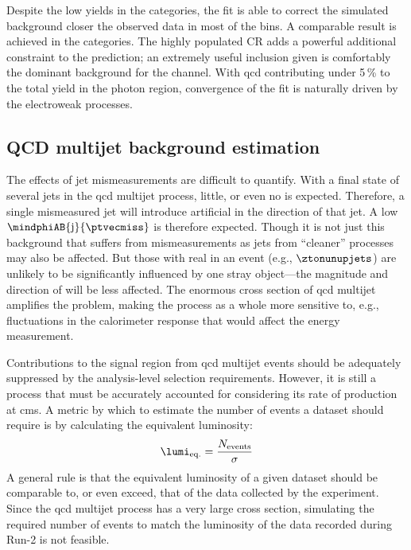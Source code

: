 Despite the low yields in the \ttH categories, the fit is able to correct the simulated background closer the observed data in most of the bins. A comparable result is achieved in the \VH categories. The highly populated \singlePhotonCr \gls{CR} adds a powerful additional constraint to the prediction; an extremely useful inclusion given \ztonunu is comfortably the dominant background for the \VH channel. With \acrshort{qcd} contributing under 5\,\% to the total yield in the photon region, convergence of the fit is naturally driven by the electroweak processes.




\subsection{QCD multijet background estimation}
\label{subsec:htoinv_qcd_multijet_bkg}

The effects of \gls{jet} mismeasurements are difficult to quantify. With a final state of several \glspl{jet} in the \acrshort{qcd} multijet process, little, or even no \ptvecmiss is expected. Therefore, a single mismeasured \gls{jet} will introduce artificial \ptvecmiss in the direction of that jet. A low $\mindphiAB{\mathrm{j}}{\ptvecmiss}$ is therefore expected. Though it is not just this background that suffers from mismeasurements as \glspl{jet} from ``cleaner'' processes may also be affected. But those with real \ptmiss in an event (e.g., $\ztonunupjets$) are unlikely to be significantly influenced by one stray object---the magnitude and direction of \ptvecmiss will be less affected. The enormous cross section of \acrshort{qcd} multijet amplifies the problem, making the process as a whole more sensitive to, e.g., fluctuations in the calorimeter response that would affect the energy measurement.

Contributions to the signal region from \acrshort{qcd} multijet events should be adequately suppressed by the analysis-level selection requirements. However, it is still a process that must be accurately accounted for considering its rate of production at \acrshort{cms}. A metric by which to estimate the number of events a dataset should require is by calculating the equivalent luminosity:
\begin{equation}
    \lumi_{\mathrm{eq.}} = \frac{N_{\mathrm{events}}}{\sigma}
    \label{eq:equivalent_lumi}
\end{equation}
A general rule is that the equivalent luminosity of a given dataset should be comparable to, or even exceed, that of the data collected by the experiment. Since the \acrshort{qcd} multijet process has a very large cross section, simulating the required number of events to match the luminosity of the data recorded during Run-2 is not feasible.

